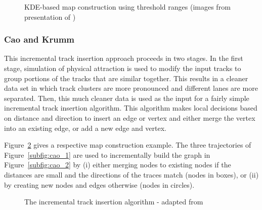 \documentclass[natbib]{svjour3}                    \smartqed  \usepackage[table]{xcolor}
\begin{document}
\begin{figure}[htbp]
 \begin{center} 
 \end{center}
\caption{KDE-based map construction using threshold ranges (images from presentation of  \cite{Biagioni:2012:MIF:2424321.2424333})}
\label{fig:biagioni}
\end{figure}


\subsubsection{Cao and Krumm \protect\cite{Cao:2009:GTR:1653771.1653776}}
This incremental track insertion approach proceeds in two stages. In the first stage, simulation of physical attraction is used to modify the input tracks to group portions of the tracks that are similar together. This results in a cleaner data set in which track clusters are more pronounced and different lanes are more separated. Then, this much cleaner data is used as the input for a fairly simple incremental track insertion algorithm. This algorithm makes local decisions based on distance and direction to insert an edge or vertex and either merge the vertex into an existing edge, or add a new edge and vertex. 

Figure~\ref{fig:cao} gives a respective map construction example. The three trajectories of Figure~\ref{subfig:cao_1} are used to incrementally build the graph in Figure~\ref{subfig:cao_2} by (i) either merging nodes to existing nodes if the distances are small and the directions of the traces match (nodes in boxes), or (ii) by creating new nodes and edges otherwise (nodes in circles). 

\begin{figure}[htbp]
 \begin{center}
 \end{center}
\caption{The incremental track insertion algorithm - adapted from \cite{Cao:2009:GTR:1653771.1653776}}
\label{fig:cao}
\end{figure}
\end{document}
